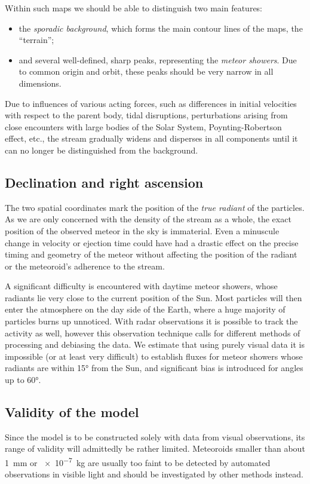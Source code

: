     Within such maps we should be able to distinguish two main features:
    \begin{itemize}
        \item the \emph{sporadic background}, which forms the main contour lines of the maps, the ``terrain'';
        \item and several well-defined, sharp peaks, representing the \emph{meteor showers}. Due to common origin and orbit,
            these peaks should be very narrow in all dimensions.
    \end{itemize}

    Due to influences of various acting forces, such as differences
    in initial velocities with respect to the parent body, tidal disruptions,
    perturbations arising from close encounters with large bodies of the Solar System,
    Poynting-Robertson effect, etc., the stream
    gradually widens and disperses in all components until it can no longer be distinguished from the background.

    \subsection{Declination and right ascension} \label{ios}
        The two spatial coordinates mark the position of the \emph{true radiant} of the particles.
        As we are only concerned with the density of the stream as a whole,
        the exact position of the observed meteor in the sky is immaterial.
        Even a minuscule change in velocity or ejection time could have had a drastic effect
        on the precise timing and geometry of the meteor without affecting
        the position of the radiant or the meteoroid's adherence to the stream.

        A significant difficulty is encountered with daytime meteor showers, whose radiants
        lie very close to the current position of the Sun.
        Most particles will then enter the atmosphere on the day side
        of the Earth, where a huge majority of particles burns up unnoticed.
        With radar observations it is possible to track the activity as well,
        however this observation technique calls for different methods of processing and debiasing the data.
        We estimate that using purely visual data it is impossible (or at least very difficult) to establish fluxes
        for meteor showers whose radiants are within \ang{15} from the Sun, and significant bias
        is introduced for angles up to \ang{60}.

    \subsection{Validity of the model} \label{iav}
        Since the model is to be constructed solely with data from visual observations,
        its range of validity will admittedly be rather limited.
        Meteoroids smaller than about \SI{1}{\milli\metre} or \SI{e-7}{\kilo\gram} are usually too faint
        to be detected by automated observations in visible light and should be investigated
        by other methods instead.

